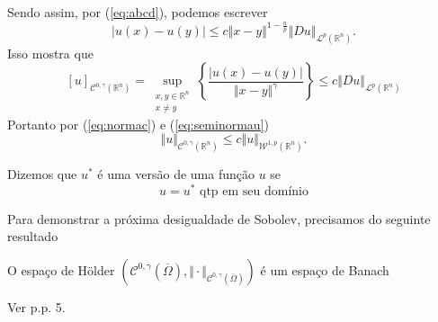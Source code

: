 \documentclass[a4paper, 11pt]{book}
\theoremstyle{definition}
\newcommand{\bR}{\mathbb{R}}
\newcommand{\cC}{\mathcal{C}}
\newcommand{\cL}{\mathcal{L}}
\newcommand{\cW}{\mathcal{W}}
\begin{document}
\begin{prf}
    Sendo assim, por (\ref{eq:abcd}), podemos escrever
    \[
        |u(x) - u(y)| \leqslant c \Vert x - y \Vert^{1 - \frac{n}{p}} \Vert Du \Vert_{\cL^p(\bR^n)}.
    \]
    Isso mostra que
    \begin{equation} \label{eq:seminormau}
        [u]_{\cC^{0,\gamma}(\bR^n)} = \sup_{\substack{x,y \in \bR^n\\x \neq y}} \left\{ \frac{|u(x) - u(y)|}{\Vert x - y \Vert^{\gamma}} \right\} \leqslant c \Vert Du \Vert_{\cL^p(\bR^n)}
    \end{equation}
    Portanto por (\ref{eq:normac}) e (\ref{eq:seminormau})
    \[
        \Vert u \Vert_{\cC^{0,\gamma}(\bR^n)} \leqslant c \Vert u \Vert_{\cW^{1,p}(\bR^n)}.
    \]
\end{prf}

\begin{dbox}
    Dizemos que $u^*$ é uma versão de uma função $u$ se
    \[
        u = u^* \text{ qtp em seu domínio}
    \]
\end{dbox}

Para demonstrar a próxima desigualdade de Sobolev, precisamos do seguinte resultado

\begin{tbox}
    O espaço de Hölder $(\cC^{0,\gamma}(\overline\Omega), \Vert \cdot \Vert_{\cC^{0,\gamma}(\overline\Omega)})$ é um espaço de Banach
\end{tbox}
\begin{prf}
    Ver \cite{irina-holder.spaces} p.p. 5.
\end{prf}
\end{document}
